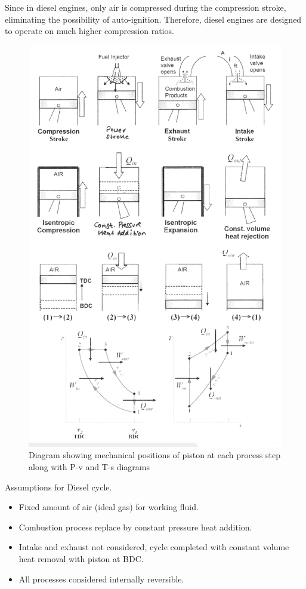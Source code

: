 \documentclass[class=report, crop=false, 12pt,a4paper]{standalone}
\begin{document}
Since in diesel engines, only air is compressed during the compression stroke, eliminating the possibility of auto-ignition. Therefore, diesel engines are designed to operate on much higher compression ratios.
\begin{figure}
  \centering
  \includegraphics[width = 0.8 \textwidth]{../img/DieselCycleDiagram}
  \caption{Diagram showing mechanical positions of piston at each process step along with P-v and T-s diagrams}
\end{figure}
Assumptions for Diesel cycle.
\begin{itemize}[noitemsep]
  \item Fixed amount of air (ideal gas) for working fluid.
  \item Combustion process replace by constant pressure heat addition.
  \item Intake and exhaust not considered, cycle completed with constant volume heat removal with piston at BDC.
  \item All processes considered internally reversible.
\end{itemize}
\end{document}
